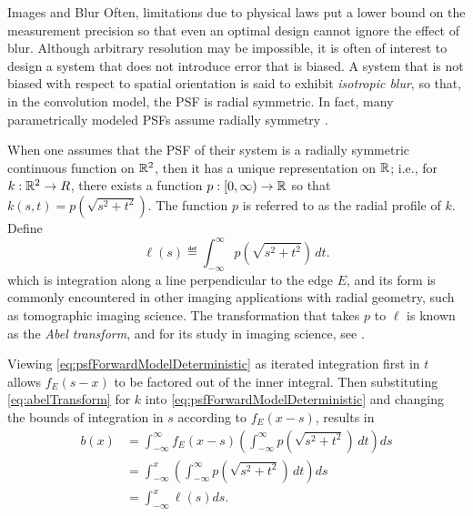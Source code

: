 \begin{chapter}{Images and Blur}
  Often, limitations due to physical laws put a lower bound on the measurement precision so that even an optimal design cannot ignore the effect of blur.
  Although arbitrary resolution may be impossible, it is often of interest to design a system that does not introduce error that is biased.
  A system that is not biased with respect to spatial orientation is said to exhibit \emph{isotropic blur}, so that, in the convolution model, the PSF is radial symmetric.
  In fact, many parametrically modeled PSFs assume radially symmetry \citep{doering1992,jain1989,kundur1996blind,watson1993}.  

  When one assumes that the PSF of their system is a radially symmetric continuous function on $\mathbb R^2$, then it has a unique representation on $\mathbb R$; i.e., for $k:\mathbb R^2 \to R$, there exists a function $p:[0,\infty)\to \mathbb R$ so that $k(s,t) = p\left(\sqrt{s^2 + t^2}\right)$.  
  The function $p$ is referred to as the radial profile of $k$.
  Define
  \begin{equation} \label{eq:abelTransform}
    \ell(s) \eqdef \int_{-\infty}^\infty p\left(\sqrt{s^2 + t^2}\right)\,dt.
  \end{equation}
  which is integration along a line perpendicular to the edge $E$, and its form is commonly encountered in other imaging applications with radial geometry, such as tomographic imaging science.
  The transformation that takes $p$ to $\ell$ is known as the \emph{Abel transform}, and for its study in imaging science, see \citep{bracewell,epstein2008,knill93}.

  Viewing \eqref{eq:psfForwardModelDeterministic} as iterated integration first in $t$ allows $f_E(s-x)$ to be factored out of the inner integral. 
  Then substituting \eqref{eq:abelTransform} for $k$ into  \eqref{eq:psfForwardModelDeterministic} and changing the bounds of integration in $s$ according to $f_E(x-s)$, results in
  \begin{align}
    b(x) &= \int_{-\infty}^\infty f_E(x-s) \left(\int_{-\infty}^\infty p\left(\sqrt{s^2 + t^2}\right)\,dt\right)ds \nonumber \\
         &= \int_{-\infty}^x \left(\int_{-\infty}^\infty p\left(\sqrt{s^2 + t^2}\right)\,dt\right)ds \nonumber \\
         &= \int_{-\infty}^x \ell(s)ds. \label{eq:abelForward}
  \end{align}


\end{chapter}

